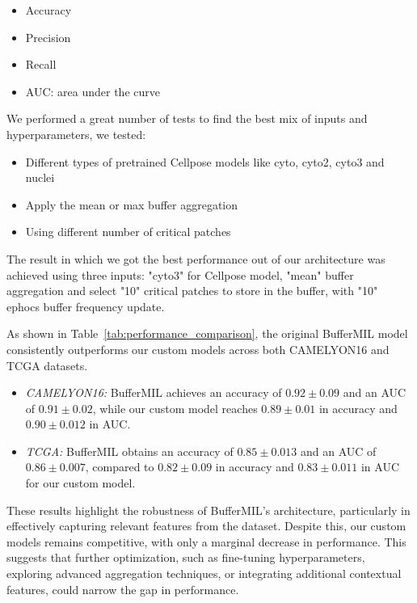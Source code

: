 \documentclass[10pt,twocolumn]{article}
\begin{document}
\begin{itemize}
\item{Accuracy}
\item{Precision}
\item{Recall}
\item{AUC: area under the curve}
\end{itemize}

We performed a great number of tests to find the best mix of inputs and hyperparameters, we tested:

\begin{itemize}
\item{Different types of pretrained Cellpose models like cyto, cyto2, cyto3 and nuclei}
\item{Apply the mean or max buffer aggregation}
\item{Using different number of critical patches}
\end{itemize}

The result in which we got the best performance out of our architecture was achieved using three inputs: "cyto3" for Cellpose model, "mean" buffer aggregation and select "10" critical patches to store in the buffer, with "10" ephocs buffer frequency update.


As shown in Table~\ref{tab:performance_comparison}, the original BufferMIL model consistently outperforms our custom models across both CAMELYON16 and TCGA datasets. 

\begin{itemize}
\item\textit{CAMELYON16:} BufferMIL achieves an accuracy of $0.92 \pm 0.09$ and an AUC of $0.91 \pm 0.02$, while our custom model reaches $0.89 \pm 0.01$ in accuracy and $0.90 \pm 0.012$ in AUC.  
\item\textit{TCGA:} BufferMIL obtains an accuracy of $0.85 \pm 0.013$ and an AUC of $0.86 \pm 0.007$, compared to $0.82 \pm 0.09$ in accuracy and $0.83 \pm 0.011$ in AUC for our custom model.
\end{itemize}

These results highlight the robustness of BufferMIL’s architecture, particularly in effectively capturing relevant features from the dataset. Despite this, our custom models remains competitive, with only a marginal decrease in performance. This suggests that further optimization, such as fine-tuning hyperparameters, exploring advanced aggregation techniques, or integrating additional contextual features, could narrow the gap in performance.
\end{document}
